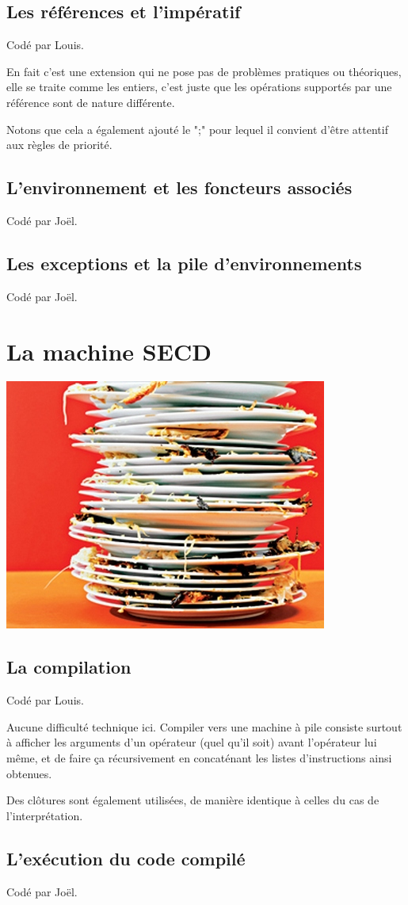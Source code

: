 \documentclass[a4paper,10pt]{report}
\begin{document}
\section{Les références et l'impératif}  
Codé par Louis.  
  
En fait c'est une extension qui ne pose pas de problèmes pratiques ou théoriques, elle se traite comme les entiers, c'est juste que les opérations supportés par une référence sont de nature différente.  
  
Notons que cela a également ajouté le ";" pour lequel il convient d'être attentif aux règles de priorité.  

\section{L'environnement et les foncteurs associés}  
Codé par Joël.

\section{Les exceptions et la pile d'environnements}  
Codé par Joël.

\chapter*{La machine SECD}

\begin{center}
\includegraphics[scale=0.7]{dirty-dishes.jpg} 
\end{center}

\section{La compilation}  
Codé par Louis.

Aucune difficulté technique ici. Compiler vers une machine à pile consiste surtout à afficher les arguments d'un opérateur (quel qu'il soit) avant l'opérateur lui même, et de faire ça récursivement en concaténant les listes d'instructions ainsi obtenues.  
  
Des clôtures sont également utilisées, de manière identique à celles du cas de l'interprétation.  

\section{L'exécution du code compilé}
Codé par Joël.  
\end{document}
